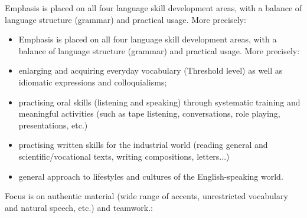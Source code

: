 Emphasis is placed on all four language skill development areas, with a balance of language structure (grammar) and practical usage. More precisely:
\begin{itemize}
    \item Emphasis is placed on all four language skill development areas, with a balance of language structure (grammar) and practical usage. More precisely:
    \item enlarging and acquiring everyday vocabulary (Threshold level) as well as idiomatic expressions and colloquialisms;
    \item practising oral skills (listening and speaking) through systematic training and meaningful activities (such as tape listening, conversations, role playing, presentations, etc.)
    \item practising written skills for the industrial world (reading general and scientific/vocational texts, writing compositions, letters...)
    \item general approach to lifestyles and cultures of the English-speaking world.
\end{itemize}
Focus is on authentic material (wide range of accents, unrestricted vocabulary and natural speech, etc.) and teamwork.: